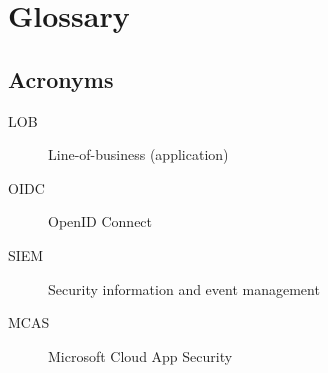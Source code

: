 \section{Glossary}
\subsection{Acronyms}
\begin{description}
	\item[LOB] Line-of-business (application)
	\item[OIDC] OpenID Connect
	\item[SIEM] Security information and event management
	\item[MCAS] Microsoft Cloud App Security
\end{description}

